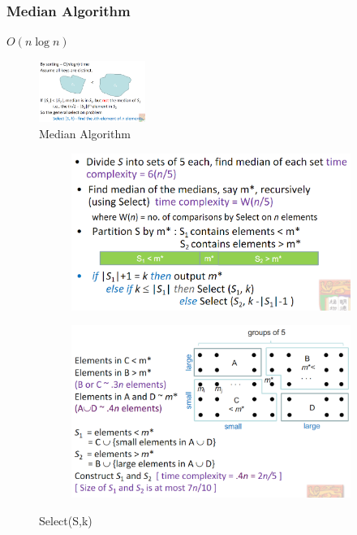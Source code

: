 \subsubsection{Median Algorithm}
$O(n\log n)$
\begin{figure}[H]
    \centering
    \includegraphics[width=0.309\textwidth]{pic/DAA3/Median Algorithm}
    \caption{Median Algorithm}
\end{figure}

\begin{figure}[H]
    \centering
    \begin{subfigure}{0.309\textwidth}
        \centering
        \includegraphics[width=\textwidth]{pic/DAA3/Select(S,k)}
    \end{subfigure}
    \begin{subfigure}{0.309\textwidth}
        \centering
        \includegraphics[width=\textwidth]{pic/DAA3/Select(S,k)2}
    \end{subfigure}
    \caption{Select(S,k)}
\end{figure}


